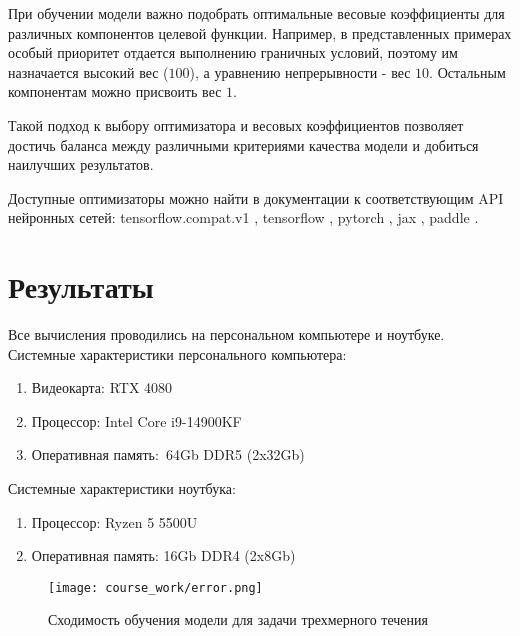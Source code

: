 При обучении модели важно подобрать оптимальные весовые коэффициенты для различных компонентов целевой функции. Например, в представленных
примерах особый приоритет отдается выполнению граничных условий, поэтому им назначается высокий вес ($100$), а уравнению непрерывности - вес $10$.
Остальным компонентам можно присвоить вес $1$.

Такой подход к выбору оптимизатора и весовых коэффициентов позволяет достичь баланса между различными критериями качества модели и добиться
наилучших результатов.

Доступные оптимизаторы можно найти в документации к соответствующим API нейронных сетей: tensorflow.compat.v1 \cite{tfv1opt},
tensorflow \cite{tfopt}, pytorch \cite{pytorchopt}, jax \cite{jaxopt}, paddle \cite{paddleopt}.
\chapter{Результаты}
Все вычисления проводились на персональном компьютере и ноутбуке.
Системные характеристики персонального компьютера:
\begin{enumerate}
    \item Видеокарта: RTX 4080
    \item Процессор: Intel Core i9-14900KF
    \item Оперативная память: 64Gb DDR5 (2x32Gb)
\end{enumerate}
Системные характеристики ноутбука:
\begin{enumerate}
    \item Процессор: Ryzen 5 5500U
    \item Оперативная память: 16Gb DDR4 (2x8Gb)
\end{enumerate}
\begin{figure}
    \texttt{[image: course\_work/error.png]}
    \caption{Сходимость обучения модели для задачи трехмерного течения}
    \label{fig:error}
\end{figure}


